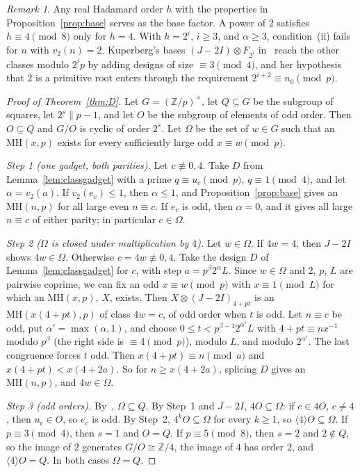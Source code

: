 \documentclass[10pt]{article}
\theoremstyle{remark}
\newtheorem*{remark}{Remark}
\newcommand{\MH}{\mathrm{MH}}
\begin{document}
\begin{remark}
Any real Hadamard order $h$ with the properties in Proposition~\ref{prop:base} serves as the base factor. A power of $2$ satisfies $h\equiv4\pmod8$ only for $h=4$. With $h=2^i$, $i\ge3$, and $\alpha\ge3$, condition~(ii) fails for $n$ with $v_2(n)=2$. Kuperberg's bases $(J-2I)\otimes F_{2^i}$ in~\cite[Theorem~5.2]{K} reach the other classes modulo $2^ip$ by adding designs of size $\equiv3\pmod4$, and her hypothesis that $2$ is a primitive root enters through the requirement $2^{i+2}\equiv n_0\pmod p$.
\end{remark}

\begin{proof}[Proof of Theorem~\ref{thm:D}]
Let $G=(\mathbb Z/p)^\times$, let $Q\subseteq G$ be the subgroup of squares, let $2^s\parallel p-1$, and let $O$ be the subgroup of elements of odd order. Then $O\subseteq Q$ and $G/O$ is cyclic of order $2^s$. Let $\Omega$ be the set of $w\in G$ such that an $\MH(x,p)$ exists for every sufficiently large odd $x\equiv w\pmod p$.

\emph{Step 1 (one gadget, both parities).} Let $c\not\equiv0,4$. Take $D$ from Lemma~\ref{lem:classgadget} with a prime $q\equiv u_c\pmod p$, $q\equiv1\pmod4$, and let $\alpha=v_2(a)$. If $v_2(e_c)\le1$, then $\alpha\le1$, and Proposition~\ref{prop:base} gives an $\MH(n,p)$ for all large even $n\equiv c$. If $e_c$ is odd, then $\alpha=0$, and it gives all large $n\equiv c$ of either parity; in particular $c\in\Omega$.

\emph{Step 2 ($\Omega$ is closed under multiplication by $4$).} Let $w\in\Omega$. If $4w=4$, then $J-2I$ shows $4w\in\Omega$. Otherwise $c=4w\not\equiv0,4$. Take the design $D$ of Lemma~\ref{lem:classgadget} for $c$, with step $a=p^\beta2^\alpha L$. Since $w\in\Omega$ and $2$, $p$, $L$ are pairwise coprime, we can fix an odd $x\equiv w\pmod p$ with $x\equiv1\pmod L$ for which an $\MH(x,p)$, $X$, exists. Then $X\otimes(J-2I)_{4+pt}$ is an $\MH(x(4+pt),p)$ of class $4w=c$, of odd order when $t$ is odd. Let $n\equiv c$ be odd, put $\alpha'=\max(\alpha,1)$, and choose $0\le t<p^{\beta-1}2^{\alpha'}L$ with $4+pt\equiv nx^{-1}$ modulo $p^\beta$ (the right side is $\equiv4\pmod p$), modulo $L$, and modulo $2^{\alpha'}$. The last congruence forces $t$ odd. Then $x(4+pt)\equiv n\pmod a$ and $x(4+pt)<x(4+2a)$. So for $n\ge x(4+2a)$, splicing $D$ gives an $\MH(n,p)$, and $4w\in\Omega$.

\emph{Step 3 (odd orders).} By~\cite[Lemma~2.2]{K}, $\Omega\subseteq Q$. By Step~1 and $J-2I$, $4O\subseteq\Omega$: if $c\in4O$, $c\ne4$, then $u_c\in O$, so $e_c$ is odd. By Step~2, $4^kO\subseteq\Omega$ for every $k\ge1$, so $\langle4\rangle O\subseteq\Omega$. If $p\equiv3\pmod4$, then $s=1$ and $O=Q$. If $p\equiv5\pmod8$, then $s=2$ and $2\notin Q$, so the image of $2$ generates $G/O\cong\mathbb Z/4$, the image of $4$ has order $2$, and $\langle4\rangle O=Q$. In both cases $\Omega=Q$.


\end{proof}
\end{document}
